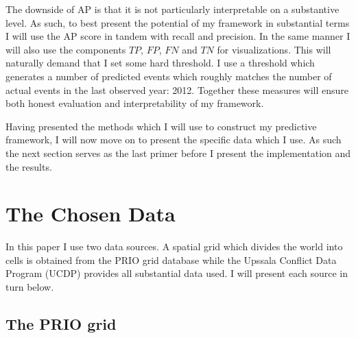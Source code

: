 \documentclass[a4paper]{article}
\begin{document}
The downside of AP is that it is not particularly interpretable on a substantive level. As such, to best present the potential of my framework in substantial terms I will use the AP score in tandem with recall and precision. In the same manner I will also use the components $TP$, $FP$, $FN$ and $TN$ for visualizations. This will naturally demand that I set some hard threshold. I use a threshold which generates a number of predicted events which roughly matches the number of actual events in the last observed year: 2012. Together these measures will ensure both honest evaluation and interpretability of my framework.\par %

Having presented the methods which I will use to construct my predictive framework, I will now move on to present the specific data which I use. As such the next section serves as the last primer before I present the implementation and the results.\par

\section{The Chosen Data}\label{data}%

In this paper I use two data sources. A spatial grid which divides the world into cells is obtained from the PRIO grid database \citep{Tollefsen_2012} while the Upssala Conflict Data Program (UCDP) \citep{Sundberg_2013, Croicu_Sundberg_2017} provides all substantial data used. I will present each source in turn below.\par

\subsection{The PRIO grid}

\end{document}
